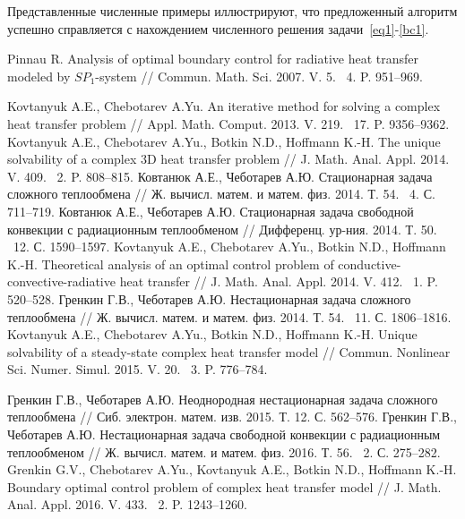 \documentclass[12pt]{article}
\begin{document}
    Представленные численные примеры иллюстрируют, что предложенный алгоритм успешно справляется
    с нахождением численного решения задачи~\eqref{eq1}-\eqref{bc1}.
    \begin{thebibliography}{999}

        Pinnau R. Analysis of optimal boundary control for radiative heat transfer modeled by $SP_1$-system //
        Commun. Math. Sci. 2007. V. 5. \textnumero~4. P. 951--969.

        Kovtanyuk A.E., Chebotarev A.Yu. An iterative method for solving a complex heat transfer problem // Appl. Math. Comput. 2013. V. 219. \textnumero~17. P. 9356--9362.
        Kovtanyuk A.E., Chebotarev A.Yu., Botkin N.D., Hoffmann K.-H. The unique solvability of a complex 3D heat transfer problem // J. Math. Anal. Appl. 2014. V. 409. \textnumero~2. P. 808--815.
        Ковтанюк А.Е., Чеботарев А.Ю. Стационарная задача сложного теплообмена // Ж. вычисл. матем. и матем. физ. 2014. Т. 54. \textnumero~4. С. 711--719.
        Ковтанюк А.Е., Чеботарев А.Ю. Стационарная задача свободной конвекции с радиационным теплообменом // Дифференц. ур-ния. 2014. Т. 50. \textnumero~12. С. 1590--1597.
        Kovtanyuk A.E., Chebotarev A.Yu., Botkin N.D., Hoffmann K.-H. Theoretical analysis of an optimal control problem of conductive-convective-radiative heat transfer // J. Math. Anal.
        Appl. 2014. V. 412. \textnumero~1. P. 520--528.
        Гренкин Г.В., Чеботарев А.Ю. Нестационарная задача сложного теплообмена // Ж. вычисл. матем. и матем. физ. 2014. Т. 54. \textnumero~11. С. 1806--1816.
        Kovtanyuk A.E., Chebotarev A.Yu., Botkin N.D., Hoffmann K.-H. Unique solvability of a steady-state complex heat transfer model // Commun. Nonlinear Sci. Numer. Simul. 2015. V. 20. \textnumero~3. P. 776--784.

        Гренкин Г.В., Чеботарев А.Ю. Неоднородная нестационарная задача сложного теплообмена // Сиб. электрон. матем. изв. 2015. Т. 12. С. 562--576.
        Гренкин Г.В., Чеботарев А.Ю. Нестационарная задача свободной конвекции с радиационным теплообменом // Ж. вычисл. матем. и матем. физ. 2016. Т. 56. \textnumero~2. С. 275--282.
        Grenkin G.V., Chebotarev A.Yu., Kovtanyuk A.E., Botkin N.D., Hoffmann K.-H. Boundary optimal control problem of complex heat transfer model // J. Math. Anal. Appl. 2016. V. 433. \textnumero~2. P. 1243--1260.




\end{thebibliography}
\end{document}
